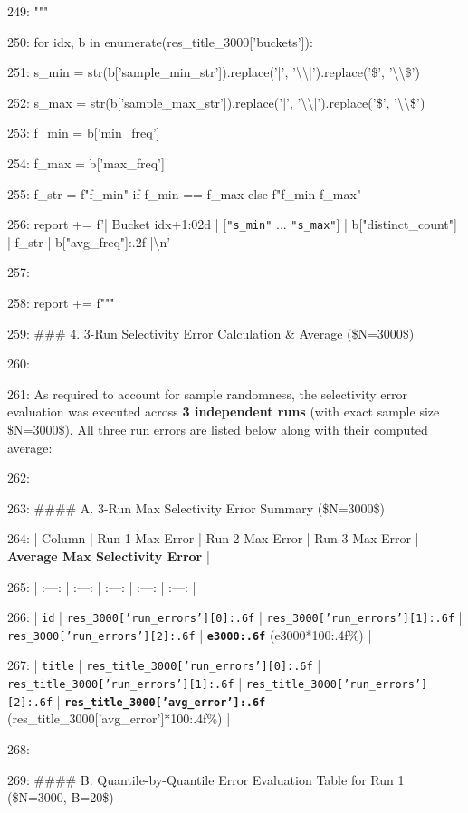 \documentclass[11pt,a4paper]{article}
\begin{document}
249: """

250:     for idx, b in enumerate(res\_title\_3000['buckets']):

251:         s\_min = str(b['sample\_min\_str']).replace('|', '\textbackslash{}\textbackslash{}|').replace('\$', '\textbackslash{}\textbackslash{}\$')

252:         s\_max = str(b['sample\_max\_str']).replace('|', '\textbackslash{}\textbackslash{}|').replace('\$', '\textbackslash{}\textbackslash{}\$')

253:         f\_min = b['min\_freq']

254:         f\_max = b['max\_freq']

255:         f\_str = f"{f\_min}" if f\_min == f\_max else f"{f\_min}-{f\_max}"

256:         report += f'| Bucket {idx+1:02d} | [\texttt{"{s\_min}"} ... \texttt{"{s\_max}"}] | {b["distinct\_count"]} | {f\_str} | {b["avg\_freq"]:.2f} |\textbackslash{}n'

257:

258:     report += f"""

259: \#\#\# 4. 3-Run Selectivity Error Calculation \& Average (\$N=3000\$)

260:

261: As required to account for sample randomness, the selectivity error evaluation was executed across \textbf{3 independent runs} (with exact sample size \$N=3000\$). All three run errors are listed below along with their computed average:

262:

263: \#\#\#\# A. 3-Run Max Selectivity Error Summary (\$N=3000\$)

264: | Column | Run 1 Max Error | Run 2 Max Error | Run 3 Max Error | \textbf{Average Max Selectivity Error} |

265: | :---: | :---: | :---: | :---: | :---: |

266: | \texttt{id} | \texttt{{res\_3000['run\_errors'][0]:.6f}} | \texttt{{res\_3000['run\_errors'][1]:.6f}} | \texttt{{res\_3000['run\_errors'][2]:.6f}} | \textbf{\texttt{{e3000:.6f}}} ({e3000*100:.4f}\%) |

267: | \texttt{title} | \texttt{{res\_title\_3000['run\_errors'][0]:.6f}} | \texttt{{res\_title\_3000['run\_errors'][1]:.6f}} | \texttt{{res\_title\_3000['run\_errors'][2]:.6f}} | \textbf{\texttt{{res\_title\_3000['avg\_error']:.6f}}} ({res\_title\_3000['avg\_error']*100:.4f}\%) |

268:

269: \#\#\#\# B. Quantile-by-Quantile Error Evaluation Table for Run 1 (\$N=3000, B=20\$)
\end{document}
